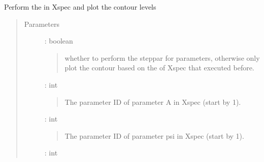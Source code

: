 \documentclass[letterpaper,10pt,english]{sphinxmanual}
\begin{document}
\begin{fulllineitems}

\begin{fulllineitems}
\label{\detokenize{APIdocs/xspecanalysis:ixpetools.xspeclib.io.XspecSpec.plot_contour}}
\sphinxAtStartPar
Perform the  in Xspec and plot the contour levels
\begin{quote}\begin{description}
\item[{Parameters}] \leavevmode
\sphinxAtStartPar
{} : boolean
\begin{quote}

\sphinxAtStartPar
whether to perform the steppar for parameters, otherwise only plot the contour
based on the  of Xspec that executed before.
\end{quote}

\sphinxAtStartPar
{} : int
\begin{quote}

\sphinxAtStartPar
The parameter ID of parameter A in Xspec (start by 1).
\end{quote}

\sphinxAtStartPar
{} : int
\begin{quote}

\sphinxAtStartPar
The parameter ID of parameter psi in Xspec (start by 1).
\end{quote}

\sphinxAtStartPar
{} : int
\begin{quote}


\end{quote}
\end{description}
\end{quote}
\end{fulllineitems}
\end{fulllineitems}
\end{document}

